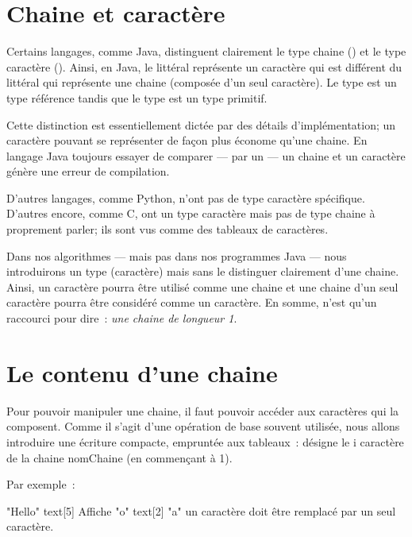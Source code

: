 	
\section{Chaine et caractère}

	Certains langages, comme Java, distinguent clairement le type chaine
	() et le type caractère ().  Ainsi, en
	Java, le littéral  représente un caractère qui est différent du
	littéral  qui représente une chaine (composée d’un seul caractère).
	Le type  est un type référence tandis que le type  est
	un type primitif. 

	Cette distinction est essentiellement dictée par des détails
	d’implémentation; un caractère pouvant se représenter de façon plus économe
	qu’une chaine. En langage Java toujours essayer de comparer — par un  — un chaine et un caractère génère une erreur de compilation. 

	D’autres langages, comme Python, n’ont pas de type caractère spécifique.
	D’autres encore, comme C, ont un type caractère mais pas de type chaine
	à proprement parler; ils sont vus comme des tableaux de caractères. 

	Dans nos algorithmes — mais pas dans nos programmes Java — nous introduirons
	un type  (caractère) mais sans le distinguer clairement d’une
	chaine.  Ainsi, un caractère pourra être utilisé comme une chaine et une
	chaine d’un seul caractère pourra être considéré comme un caractère.  En
	somme,  n’est qu’un raccourci pour dire~: \emph{une chaine de
	longueur 1}. 
	
\section{Le contenu d’une chaine}

	Pour pouvoir manipuler une chaine, il faut pouvoir accéder aux caractères
	qui la composent.  Comme il s’agit d’une opération de base souvent utilisée,
	nous allons introduire une écriture compacte, empruntée aux tableaux~:
	 désigne le i\ieme{} caractère de la chaine nomChaine (en
	commençant à 1).
	
	Par exemple~:
	\begin{pseudocode}
		 \Gets "Hello"
		\Write text[5]	\RComment Affiche "o"
		\Let text[2] \Gets "a" 
			\Let\RComment un caractère doit être remplacé par un seul caractère.
	\end{pseudocode}

